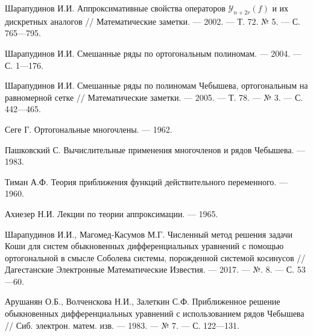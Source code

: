 \begin{thebibliography}{111}
Шарапудинов И.И. Аппроксимативные свойства операторов $\mathcal{Y}_{n+2r}(f)$ и их дискретных аналогов // Математические заметки. --- 2002. --- Т. 72. № 5. --- С. 765---795.








Шарапудинов И.И. Смешанные ряды по ортогональным полиномам. --- 2004. --- С. 1---176.








Шарапудинов И.И. Смешанные ряды по полиномам Чебышева, ортогональным на равномерной сетке // Математические заметки. --- 2005. --- Т. 78. --- № 3. --- С. 442---465.







Сеге Г. Ортогональные многочлены. --- 1962.








Пашковский С. Вычислительные применения многочленов и рядов Чебышева. --- 1983.








Тиман А.Ф. Теория приближения функций действительного переменного. --- 1960.








Ахиезер Н.И. Лекции по теории аппроксимации. --- 1965.








Шарапудинов И.И., Магомед-Касумов М.Г. Численный метод решения задачи Коши для систем обыкновенных дифференциальных уравнений с помощью ортогональной в смысле Соболева системы, порожденной системой косинусов // Дагестанские Электронные Математические Известия. --- 2017. --- №. 8. --- С. 53---60.








Арушанян О.Б., Волченскова Н.И., Залеткин С.Ф. Приближенное решение обыкновенных дифференциальных уравнений с использованием рядов Чебышева // Сиб. электрон. матем. изв. --- 1983. --- № 7. --- С. 122---131.









\end{thebibliography}
